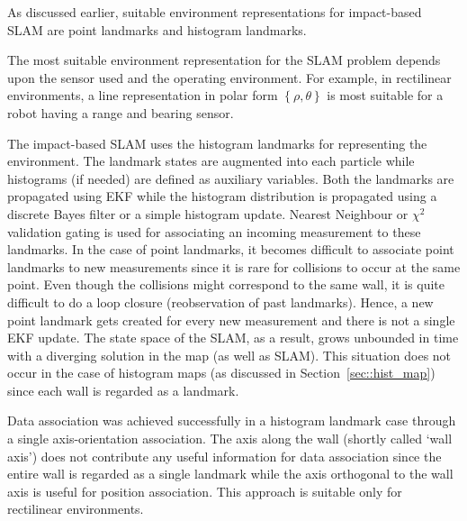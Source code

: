 As discussed earlier, suitable environment representations for impact-based SLAM are point landmarks and histogram landmarks.
\begin{rem}
The most suitable environment representation for the SLAM problem depends upon the sensor used and the operating environment. For example, in rectilinear environments, a line representation in polar form $\left\lbrace\rho,\theta\right\rbrace$ is most suitable for a robot having a range and bearing sensor. 
\end{rem}

The impact-based SLAM uses the histogram landmarks for representing the environment. The landmark states are augmented into each particle while histograms (if needed) are defined as auxiliary variables. Both the landmarks are propagated using EKF while the histogram distribution is propagated using a discrete Bayes filter or a simple histogram update. Nearest Neighbour or $\chi^2$ validation gating is used for associating an incoming measurement to these landmarks. In the case of point landmarks, it becomes difficult to associate point landmarks to new measurements since it is rare for collisions to occur at the same point. Even though the collisions might correspond to the same wall, it is quite difficult to do a loop closure (reobservation of past landmarks). Hence, a new point landmark gets created for every new measurement and there is not a single EKF update. The state space of the SLAM, as a result, grows unbounded in time with a diverging solution in the map (as well as SLAM). This situation does not occur in the case of histogram maps (as discussed in Section~\ref{sec::hist_map}) since each wall is regarded as a landmark. 
\begin{rem}
Data association was achieved successfully in a histogram landmark case through a single axis-orientation association. The axis along the wall (shortly called `wall axis') does not contribute any useful information for data association since the entire wall is regarded as a single landmark while the axis orthogonal to the wall axis is useful for position association. This approach is suitable only for rectilinear environments.  
\end{rem}

